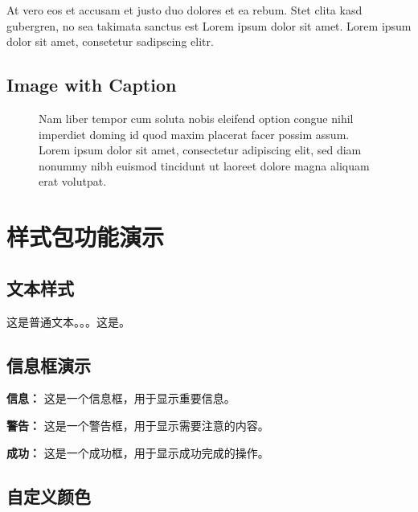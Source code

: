\documentclass[11pt,a4paper]{article}
\begin{document}
At vero eos et accusam et justo duo dolores et ea rebum. Stet clita kasd gubergren, no sea takimata sanctus est Lorem ipsum dolor sit amet. Lorem ipsum dolor sit amet, consetetur sadipscing elitr.

\subsection{Image with Caption}

\begin{figure}[H]
\centering
\caption{Nam liber tempor cum soluta nobis eleifend option congue nihil imperdiet doming id quod maxim placerat facer possim assum. Lorem ipsum dolor sit amet, consectetur adipiscing elit, sed diam nonummy nibh euismod tincidunt ut laoreet dolore magna aliquam erat volutpat.}
\label{fig:example}
\end{figure}

\section{样式包功能演示}

\subsection{文本样式}

这是普通文本。。。这是。

\subsection{信息框演示}

\begin{infobox}
    \textbf{信息：} 这是一个信息框，用于显示重要信息。
\end{infobox}

\begin{warningbox}
    \textbf{警告：} 这是一个警告框，用于显示需要注意的内容。
\end{warningbox}

\begin{successbox}
    \textbf{成功：} 这是一个成功框，用于显示成功完成的操作。
\end{successbox}

\subsection{自定义颜色}
\end{document}
